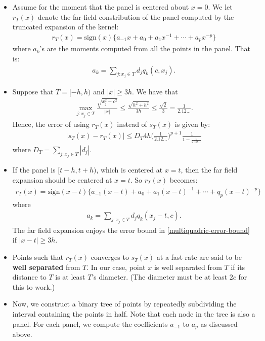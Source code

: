 \documentclass[10pt]{article}
\newcommand{\sign}{\mathrm{sign}}
\begin{document}
\begin{itemize}
  \item Assume for the moment that the panel is centered about $x = 0$. We let $r_T(x)$ denote the far-field constribution of the panel computed by the truncated expansion of the kernel:
  \begin{align*}
    r_T(x) = \sign(x) \{ a_{-1}x + a_0 + a_1 x^{-1} + \dotsb + a_p x^{-p} \}
  \end{align*}
  where $a_k$'s are the moments computed from all the points in the panel. That is:
  \begin{align*}
    a_k = \sum_{j: x_j \in T} d_j q_k(c, x_j).
  \end{align*}
  
  \item Suppose that $T = [-h, h)$ and $|x| \geq 3h$. We have that
  \begin{align*}
    \max_{j: x_j \in T} \frac{\sqrt{x_j^2 + c^2}}{|x|} \leq \frac{\sqrt{h^2 + h^2}}{3h} \leq \frac{\sqrt{2}}{3} = \frac{1}{2.12\ldots}.
  \end{align*}
  Hence, the error of using $r_T(x)$ instead of $s_T(x)$ is given by:
  \begin{align}
    |s_T(x) - r_T(x)| \leq D_T 4h \bigg( \frac{1}{2.12\ldots} \bigg)^{p+1} \frac{1}{1 - \frac{1}{2.12\ldots}} \label{multiquadric-error-bound}
  \end{align}
  where $D_T = \sum_{j: x_j \in T} |d_j|$.
  
  \item If the panel is $[t-h, t+h)$, which is centered at $x = t$, then the far field expansion should be centered at $x = t$. So $r_T(x)$ becomes:
  \begin{align*}
    r_T(x) = \sign(x-t) \{ a_{-1}(x-t) + a_0 + a_1(x-t)^{-1} + \dotsb + q_p(x-t)^{-p}\}
  \end{align*}
  where
  \begin{align*}
    a_k = \sum_{j: x_j \in T} d_j q_k(x_j - t, c).
  \end{align*}
  The far field expansion enjoys the error bound in \eqref{multiquadric-error-bound} if $|x-t| \geq 3h$.
  
  \item Points such that $r_T(x)$ converges to $s_T(x)$ at a fast rate are said to be \textbf{well separated} from $T$. In our case, point $x$ is well separated from $T$ if its distance to $T$ is at least $T$'s diameter. (The diameter must be at least $2c$ for this to work.)
  
  \item Now, we construct a binary tree of points by repeatedly subdividing the interval containing the points in half. Note that each node in the tree is also a panel. For each panel, we compute the coefficients $a_{-1}$ to $a_p$ as discussed above.
  

\end{itemize}
\end{document}
